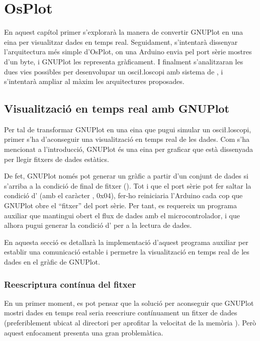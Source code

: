 \documentclass{tfgitic}[2023/06/30]
\begin{document}
\chapter{OsPlot}

En aquest capítol primer s'explorarà la manera de convertir GNUPlot en
una eina per visualitzar dades en temps real. Seguidament, s'intentarà
dissenyar l'arquitectura més simple d'OsPlot, on una Arduino envia pel
port sèrie mostres d'un byte, i GNUPlot les representa gràficament. I
finalment s'analitzaran les dues vies possibles per desenvolupar un
osci\l.loscopi amb sistema de , i s'intentarà ampliar al
màxim les arquitectures proposades.

\section{Visualització en temps real amb GNUPlot}

Per tal de transformar GNUPlot en una eina que pugui simular un
osci\l.loscopi, primer s'ha d'aconseguir una visualització en temps
real de les dades. Com s'ha mencionat a l'introducció, GNUPlot és una
eina per graficar que està dissenyada per llegir fitxers de dades
estàtics.

De fet, GNUPlot només pot generar un gràfic a partir d'un conjunt de
dades si s'arriba a la condició de final de fitxer (). Tot i
que el port sèrie pot fer saltar la condició d' (amb el
caràcter , 0x04), fer-ho reiniciaria l'Arduino cada cop que
GNUPlot obre el ``fitxer'' del port sèrie. Per tant, es requereix un
programa auxiliar que mantingui obert el flux de dades amb el
microcontrolador, i que alhora pugui generar la condició d'
per a la lectura de dades.

En aquesta secció es detallarà la implementació d'aquest programa
auxiliar per establir una comunicació estable i permetre la
visualització en temps real de les dades en el gràfic de GNUPlot.

\subsection{Reescriptura contínua del fitxer}

En un primer moment, es pot pensar que la solució per aconseguir que
GNUPlot mostri dades en temps real seria reescriure contínuament un
fitxer de dades (preferiblement ubicat al directori  per
aprofitar la velocitat de la memòria ). Però aquest
enfocament presenta una gran problemàtica.
\end{document}
